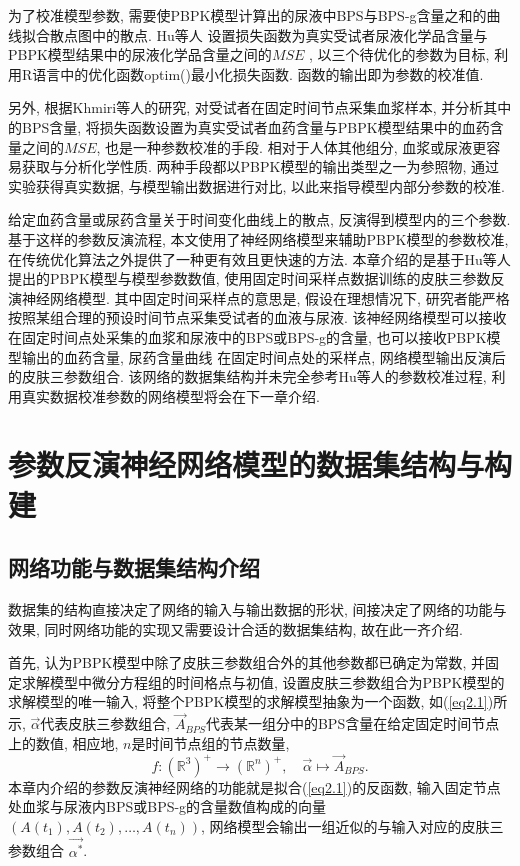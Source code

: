 \documentclass[a4paper,punct=banjiao,twoside]{ctexrep}
\theoremstyle{plain}
\theoremstyle{definition}
\theoremstyle{remark}
\begin{document}
为了校准模型参数, 需要使PBPK模型计算出的尿液中BPS与BPS-g含量之和的曲线拟合散点图中的散点. Hu等人\cite{11} 设置损失函数为真实受试者尿液化学品含量与PBPK模型结果中的尿液化学品含量之间的$MSE$
, 以三个待优化的参数为目标, 利用R语言中的优化函数optim()最小化损失函数. 函数的输出即为参数的校准值. 

另外, 根据Khmiri等人\cite{13}的研究, 对受试者在固定时间节点采集血浆样本, 并分析其中的BPS含量, 将损失函数设置为真实受试者血药含量与PBPK模型结果中的血药含量之间的$MSE$, 也是一种参数校准的手段.
相对于人体其他组分, 血浆或尿液更容易获取与分析化学性质. 两种手段都以PBPK模型的输出类型之一为参照物, 通过实验获得真实数据, 与模型输出数据进行对比, 以此来指导模型内部分参数的校准.

给定血药含量或尿药含量关于时间变化曲线上的散点, 反演得到模型内的三个参数. 基于这样的参数反演流程, 本文使用了神经网络模型来辅助PBPK模型的参数校准, 在传统优化算法之外提供了一种更有效且更快速的方法.
本章介绍的是基于Hu等人\cite{11}提出的PBPK模型与模型参数数值, 使用固定时间采样点数据训练的皮肤三参数反演神经网络模型. 其中固定时间采样点的意思是, 
假设在理想情况下, 研究者能严格按照某组合理的预设时间节点采集受试者的血液与尿液. 该神经网络模型可以接收在固定时间点处采集的血浆和尿液中的BPS或BPS-g的含量, 也可以接收PBPK模型输出的血药含量, 尿药含量曲线
在固定时间点处的采样点, 网络模型输出反演后的皮肤三参数组合. 该网络的数据集结构并未完全参考Hu等人\cite{11}的参数校准过程, 利用真实数据校准参数的网络模型将会在下一章介绍.

\section{参数反演神经网络模型的数据集结构与构建}
\label{3.2}

\subsection{网络功能与数据集结构介绍}
数据集的结构直接决定了网络的输入与输出数据的形状, 间接决定了网络的功能与效果, 同时网络功能的实现又需要设计合适的数据集结构, 故在此一齐介绍.

首先, 认为PBPK模型中除了皮肤三参数组合外的其他参数都已确定为常数, 并固定求解模型中微分方程组的时间格点与初值, 设置皮肤三参数组合为PBPK模型的求解模型的唯一输入, 
将整个PBPK模型的求解模型抽象为一个函数, 如(\ref{eq2.1})所示,  $\vec{\alpha}$代表皮肤三参数组合, $\vec{A}_{BPS}$代表某一组分中的BPS含量在给定固定时间节点上的数值, 相应地, $n$是时间节点组的节点数量,
\begin{equation}\label{eq2.1}
f:(\mathbb{R}^3)^{+} \to (\mathbb{R}^n)^{+},\quad \vec{\alpha}\mapsto \vec{A}_{BPS}.
\end{equation}
\noindent 本章内介绍的参数反演神经网络的功能就是拟合(\ref{eq2.1})的反函数, 输入固定节点处血浆与尿液内BPS或BPS-g的含量数值构成的向量$(A(t_1),A(t_2),\dots,A(t_n))$, 网络模型会输出一组近似的与输入对应的皮肤三参数组合
$\vec{\alpha^*}$.
\end{document}
